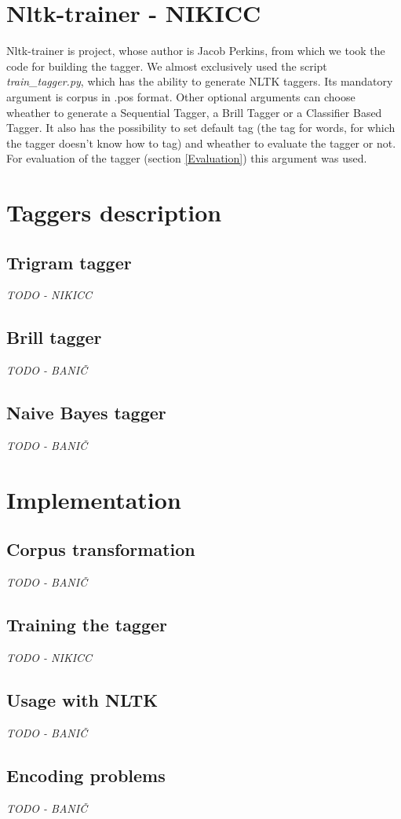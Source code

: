 \documentclass[11pt,a4paper,english,twocolumn]{article}
\begin{document}
\section{Nltk-trainer - NIKICC}
Nltk-trainer\cite{nltk-trainer} is project, whose author is Jacob Perkins, from which we took the code for building the tagger. We almost exclusively used the script \textit{train\_tagger.py}, which has the ability to generate NLTK taggers. Its mandatory argument is corpus in .pos format. Other optional arguments can choose wheather to generate a Sequential Tagger, a Brill Tagger or a Classifier Based Tagger. It also has the possibility to set default tag (the tag for words, for which the tagger doesn't know how to tag) and wheather to evaluate the tagger or not. For evaluation of the tagger (section \ref{Evaluation}) this argument was used. 
\section{Taggers description}
\subsection{Trigram tagger}
\textit{TODO - NIKICC}
\subsection{Brill tagger}
\textit{TODO - BANIČ}
\subsection{Naive Bayes tagger}
\textit{TODO - BANIČ}
\section{Implementation}
\subsection{Corpus transformation}\label{Corpus transformation}
\textit{TODO - BANIČ}
\subsection{Training the tagger}
\textit{TODO - NIKICC}
\subsection{Usage with NLTK}
\textit{TODO - BANIČ}
\subsection{Encoding problems}
\textit{TODO - BANIČ}
\end{document}

